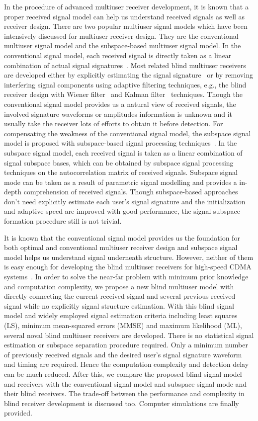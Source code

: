 \documentclass[conference]{IEEEtran}
\begin{document}
In the procedure of advanced multiuser receiver development, it is
known that a proper received signal model can help us understand
received signals as well as receiver design. There are two popular
multiuser signal models which have been intensively discussed for
multiuser receiver design. They are the conventional multiuser
signal model and the subspace-based multiuser signal model. In the
conventional signal model, each received signal is directly taken
as a linear combination of actual signal
signatures~\cite{Verd98,Honi95,Zhang02}. Most related blind
multiuser receivers are developed either by explicitly estimating
the signal signature~\cite{Torl97} or by removing interfering
signal components using adaptive filtering techniques, e.g., the
blind receiver design with Wiener filter~\cite{Honi95} and Kalman
filter~\cite{Zhang02} techniques. Though the conventional signal
model provides us a natural view of received signals, the involved
signature waveforms or amplitudes information is unknown and it
usually take the receiver lots of efforts to obtain it before
detection. For compensating the weakness of the conventional
signal model, the subspace signal model is proposed with
subspace-based signal processing techniques~\cite{Wang98}. In the
subspace signal model, each received signal is taken as a linear
combination of signal subspace bases, which can be obtained by
subspace signal processing techniques on the autocorrelation
matrix of received signals. Subspace signal mode can be taken as a
result of parametric signal modelling and provides a in-depth
comprehension of received signals. Though subspace-based
approaches don't need explicitly estimate each user's signal
signature and the initialization and adaptive speed are improved
with good performance, the signal subspace formation procedure
still is not trivial.

It is known that the conventional signal model provides us the
foundation for both optimal and conventional multiuser receiver
design and subspace signal model helps us understand signal
underneath structure. However, neither of them is easy enough for
developing the blind multiuser receivers for high-speed CDMA
systems~\cite{Andr05}. In order to solve the near-far problem with
minimum prior knowledge and computation complexity, we propose a
new blind multiuser model with directly connecting the current
received signal and several previous received signal while no
explicitly signal structure estimation. With this blind signal
model and widely employed signal estimation criteria including
least squares (LS), minimum mean-squared errors (MMSE) and maximum
likelihood (ML), several noval blind multiuser receivers are
developed. There is no statistical signal estimation or subspace
separation procedure required. Only a minimum number of previously
received signals and the desired user's signal signature waveform
and timing are required. Hence the computation complexity and
detection delay can be much reduced. After this, we compare the
proposed blind signal model and receivers with the conventional
signal model and subspace signal mode and their blind receivers.
The trade-off between the performance and complexity in blind
receiver development is discussed too. Computer simulations are
finally provided.
\end{document}
